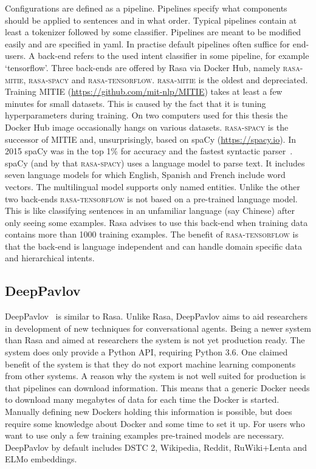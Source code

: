 Configurations are defined as a pipeline.
Pipelines specify what components should be applied to sentences and in what order.
Typical pipelines contain at least a tokenizer followed by some classifier.
Pipelines are meant to be modified easily and are specified in yaml.
In practise default pipelines often suffice for end-users.
A back-end refers to the used intent classifier in some pipeline, for example `tensorflow'.
Three back-ends are offered by Rasa via Docker Hub, namely \textsc{rasa-mitie}, \textsc{rasa-spacy} and \textsc{rasa-tensorflow}.
\textsc{rasa-mitie} is the oldest and depreciated.
Training MITIE (\url{https://github.com/mit-nlp/MITIE}) takes at least a few minutes for small datasets.
This is caused by the fact that it is tuning hyperparameters during training.
On two computers used for this thesis the Docker Hub image occasionally hangs on various datasets.
\textsc{rasa-spacy} is the successor of MITIE and, unsurprisingly, based on spaCy (\url{https://spacy.io}).
In 2015 spaCy was in the top 1\% for accuracy and the fastest syntactic parser~\citep{choi2015depends}.
spaCy (and by that \textsc{rasa-spacy}) uses a language model to parse text.
It includes seven language models for which English, Spanish and French include word vectors.
The multilingual model supports only named entities.
Unlike the other two back-ends \textsc{rasa-tensorflow} is not based on a pre-trained language model.
This is like classifying sentences in an unfamiliar language (say Chinese) after only seeing some examples.
Rasa advises to use this back-end when training data contains more than 1000 training examples.
The benefit of \textsc{rasa-tensorflow} is that the back-end is language independent and can handle domain specific data and hierarchical intents.

\subsection{DeepPavlov}
\label{subsec:deeppavlov}
DeepPavlov~\citep{burtsev2018} is similar to Rasa.
Unlike Rasa, DeepPavlov aims to aid researchers in development of new techniques for conversational agents.
Being a newer system than Rasa and aimed at researchers the system is not yet production ready.
The system does only provide a Python API, requiring Python 3.6.
One claimed benefit of the system is that they do not export machine learning components from other systems.
A reason why the system is not well suited for production is that pipelines can download information.
This means that a generic Docker needs to download many megabytes of data for each time the Docker is started.
Manually defining new Dockers holding this information is possible, but does require some knowledge about Docker and some time to set it up.
For users who want to use only a few training examples pre-trained models are necessary.
DeepPavlov by default includes DSTC 2, Wikipedia, Reddit, RuWiki+Lenta and ELMo embeddings.

